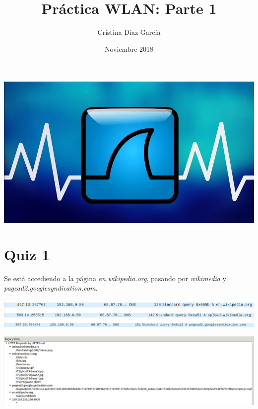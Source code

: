 \documentclass{article}
\title{Práctica WLAN: Parte 1}
\author{Cristina Díaz García}
\date{Noviembre 2018}
\begin{document}

\begin{titlingpage}
\maketitle

\begin{center}
\includegraphics[scale=0.4]{WLAN/wireshark.jpg} 
\end{center}

\end{titlingpage}

\newpage

\tableofcontents

\newpage

\section{Quiz 1}

Se está accediendo a la página \textit{en.wikipedia.org}, pasando por \textit{wikimedia} y \textit{pagead2.googlesyndication.com}.

\begin{center}
\includegraphics[scale=0.4]{WLAN/wikipedia.png} %
\includegraphics[scale=0.4]{WLAN/wikipedia3.png} %
\includegraphics[scale=0.4]{WLAN/pagead2.png} %
\end{center}

\begin{center}
\includegraphics[scale=0.3]{WLAN/trafico.png}
\end{center}
\end{document}
